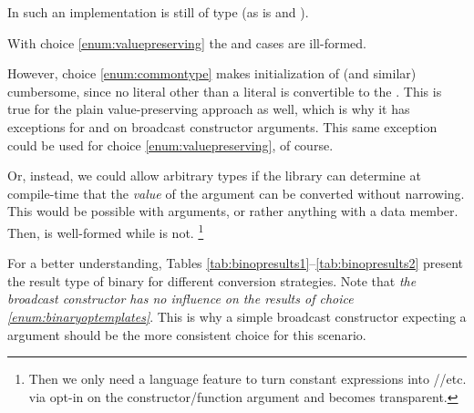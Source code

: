 In such an implementation  is still of type
 (as is  and ).

With choice \ref{enum:valuepreserving} the  and
 cases are ill-formed.

However, choice \ref{enum:commontype} makes initialization of
 (and similar) cumbersome, since no literal other than a
 literal is convertible to the \simd.
This is true for the plain value-preserving approach as well, which is why it
has exceptions for  and  on broadcast constructor
arguments.
This same exception could be used for choice \ref{enum:valuepreserving}, of
course.

Or, instead, we could allow arbitrary types if the library can determine at
compile-time that the \emph{value} of the argument can be converted without
narrowing.
This would be possible with  arguments, or rather
anything with a  data member.
Then, \std{} is well-formed while
\std{} is not.%
\footnote{Then we only need a language feature to turn constant expressions
into //etc. via opt-in on the
constructor/function argument and \std{} becomes transparent.}

For a better understanding, Tables
\ref{tab:binopresults1}--\ref{tab:binopresults2} present the result type of
binary  for different conversion strategies.
Note that \emph{the broadcast constructor has no influence on the results of
choice \ref{enum:binaryoptemplates}}.
This is why a simple broadcast constructor expecting a 
argument should be the more consistent choice for this scenario.

